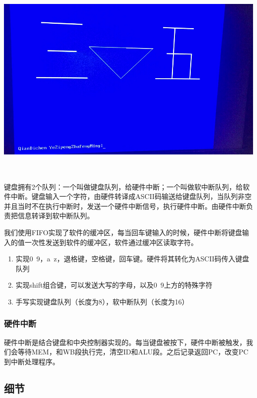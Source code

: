 \begin{center}
    \includegraphics[height=10cm]{image/extension/35.JPG}
    \label{fig:35}
\end{center}

键盘拥有2个队列：一个叫做键盘队列，给硬件中断；一个叫做软中断队列，给软件中断。键盘输入一个字符，由硬件转译成ASCII码输送给键盘队列，当队列非空并且当时不在执行中断时，发送一个硬件中断信号，执行硬件中断。由硬件中断负责把信息转译到软中断队列。

我们使用FIFO实现了软件的缓冲区，每当回车键输入的时候，硬件中断将键盘输入的值一次性发送到软件的缓冲区，软件通过缓冲区读取字符。

\begin{enumerate}
    \item 实现0~9，a~z，退格键，空格键，回车键。硬件将其转化为ASCII码传入键盘队列
    \item 实现shift组合键，可以发送大写的字母，以及0~9上方的特殊字符
    \item 手写实现键盘队列（长度为8），软中断队列（长度为16）
\end{enumerate}


\subsubsection{硬件中断}

硬件中断是结合键盘和中央控制器实现的。每当键盘被按下，硬件中断被触发，我们会等待MEM，和WB段执行完，清空ID和ALU段。之后记录返回PC，改变PC到中断处理程序。


\subsection{细节}

